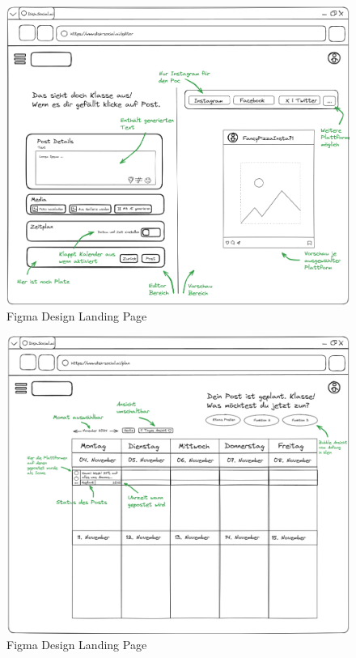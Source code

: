\begin{figure}[htbp]
    \centering
    \includegraphics[width=\textwidth]{abbildungen/Konzept/Konzept Editor}
    \caption{Figma Design Landing Page}
    \label{fig:editor-concept}
\end{figure}
\newpage

\begin{figure}[htbp]
    \centering
    \includegraphics[width=\textwidth]{abbildungen/Konzept/Konzept Kalender}
    \caption{Figma Design Landing Page}
    \label{fig:calendar-concept}
\end{figure}
\newpage

